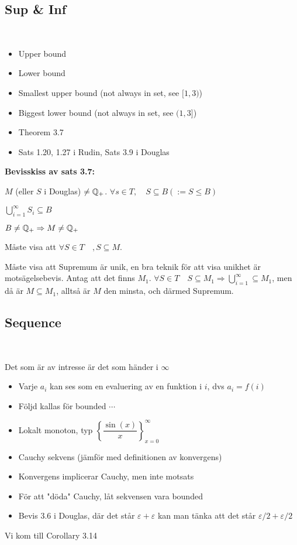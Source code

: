 \subsection{Sup \& Inf}\hfill\\\par
\begin{itemize}
  \item Upper bound
  \item Lower bound
  \item Smallest upper bound (not always in set, see $[1,3)$)
  \item Biggest lower bound (not always in set, see $(1,3]$)
  \item Theorem 3.7
  \item Sats 1.20, 1.27 i Rudin, Sats 3.9 i Douglas
\end{itemize}
\par\bigskip
\noindent\textbf{Bevisskiss av sats 3.7:}\par
\noindent $M$ (eller $S$ i Douglas) $\neq \mathbb{Q}_+$. $\forall s\in T,\quad S\subseteq B(:=S\leq B)$\par
\noindent $\bigcup_{i=1}^{\infty}S_i\subseteq B$\par
\noindent $B\neq\mathbb{Q}_+\Rightarrow M\neq\mathbb{Q}_+$\par
\noindent Måste visa att $\forall S\in T\quad, S\subseteq M$.\par
\noindent Måste visa att Supremum är unik, en bra teknik för att visa unikhet är motsägelsebevis. Antag att det finns $M_1$. $\forall S\in T\quad S\subseteq M_1\Rightarrow\bigcup_{i=1}^{\infty}\subseteq M_1$, men då är $M\subseteq M_1$, alltså är $M$ den minsta, och därmed Supremum.
\par\bigskip
\subsection{Sequence}\hfill\\\par
\noindent Det som är av intresse är det som händer i $\infty$
\par\bigskip
\begin{itemize}
  \item Varje $a_i$ kan ses som en evaluering av en funktion i $i$, dvs $a_i=f(i)$
  \item Följd kallas för bounded $\cdots$
  \item Lokalt monoton, typ $\left\{\dfrac{\sin(x)}{x}\right\}_{x=0}^{\infty}$
  \item Cauchy sekvens (jämför med definitionen av konvergens)
  \item Konvergens implicerar Cauchy, men inte motsats 
  \item För att "döda" Cauchy, låt sekvensen vara bounded
  \item Bevis 3.6 i Douglas, där det står $\varepsilon+\varepsilon$ kan man tänka att det står $\varepsilon/2+\varepsilon/2$
\end{itemize}
\par\bigskip
\noindent Vi kom till Corollary 3.14
